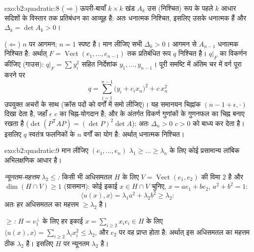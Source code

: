 \begin{solution}{exo:b2:quadratic:8}
($\Rightarrow$) ऊपरी-बायाँ $k \times k$ खंड $A_k$ उस (निश्चित) रूप के पहले $k$ आधार सदिशों के
विस्तार तक प्रतिबंधन का आव्यूह है: अतः धनात्मक निश्चित, इसलिए उसके
 धनात्मक हैं और $\Delta_k = \det A_k > 0$।

($\Leftarrow$) $n$ पर आगमन; $n = 1$ स्पष्ट है। मान लीजिए सभी $\Delta_k > 0$। आगमन से $A_{n-1}$ धनात्मक
निश्चित है: अर्थात् $F = \operatorname{Vect}(e_1, \dots,
e_{n-1})$ तक प्रतिबंधित रूप $q$ निश्चित है। $q|_F$ का विकर्णन
कीजिए (गाउस): $q|_F = \sum y_i^2$ सहित निर्देशांक $y_1, \dots, y_{n-1}$। पूरी समष्टि में अंतिम चर में वर्ग
पूरा करने पर
\[
q = \sum_{i=1}^{n-1} \bigl(y_i + c_i x_n\bigr)^2 + c\,x_n^2
\]
उपयुक्त अचरों के साथ (क्रॉस पदों को वर्गों में समो लीजिए)। यह समानयन
चिह्नांक $(n-1 + \epsilon, \cdot)$ दिखा देता है, जहाँ $\epsilon$ $c$ का चिह्न-योगदान है; और 
 के अंतर्गत विकर्ण गुणांकों के गुणनफल का चिह्न बनाए रखता है
($\det(P^{\mathsf T}AP) = (\det P)^2\det A$): अतः $\Delta_n
> 0$ $c > 0$ को बाध्य कर देता है। इसलिए $q$ स्वतंत्र फलनिकों के
$n$ वर्गों का योग है: अर्थात् धनात्मक निश्चित।
\end{solution}

\begin{solution}{exo:b2:quadratic:9}
मान लीजिए $(e_1, \dots, e_n)$ $\lambda_1
\geq \dots \geq \lambda_n$ के लिए कोई प्रसामान्य लांबिक अभिलक्षणिक आधार है।

\emph{न्यूनतम-महत्तम $\lambda_2 \leq$:} किसी भी अधिसमतल $H$ के लिए $V = \operatorname{Vect}(e_1, e_2)$ की विमा $2$ है
और $\dim(H \cap V) \geq 1$ (ग्रासमान): कोई इकाई $x \in H \cap V$ चुनिए, $x = ae_1 + be_2$, $a^2 + b^2 = 1$:
\[
\langle u(x), x\rangle = \lambda_1 a^2 + \lambda_2 b^2 \geq
\lambda_2 :
\]
अतः हर अधिसमतल का महत्तम $\geq \lambda_2$ है।

\emph{$\geq$:} $H = e_1^{\perp}$ के लिए हर इकाई $x = \sum_{i\geq2}
x_ie_i \in H$ के लिए $\langle u(x), x\rangle = \sum_{i \geq 2}
\lambda_i x_i^2 \leq \lambda_2$, और $e_2$ पर वह प्राप्त होता
है: अर्थात् इस अधिसमतल का महत्तम ठीक $\lambda_2$ है। इसलिए $H$ पर न्यूनतम $\lambda_2$ है।
\end{solution}

